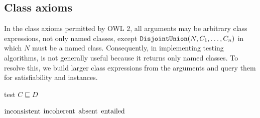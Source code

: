 \documentclass[paper.tex]{subfiles}
\begin{document}
\subsection{Class axioms}
\label{sec:algorithms:class}

In the class axioms permitted by OWL 2, all arguments may be arbitrary class expressions, not only named classes, except $\mathtt{DisjointUnion}(N, C_1, \ldots, C_n)$ in which $N$ must be a named class.  Consequently, in implementing testing algorithms,  is not generally useful because it returns only named classes.  To resolve this, we build larger class expressions from the arguments and query them for satisfiability and instances.  


\begin{algorithm}[H]
  \caption{test $C \sqsubseteq D$}
  \begin{algorithmic}[1]
    \raggedright
        \State \Return $\mathrm{inconsistent}$
        \label{alg:testSubClassOf:returnInconsistent}
        \State \Return $\mathrm{incoherent}$
        \label{alg:testSubClassOf:returnIncoherent}
        \State \Return $\mathrm{absent}$
      \Else
        \State \Return $\mathrm{entailed}$
        \label{alg:testSubClassOf:returnEntailed}
      \EndIf
    \EndFunction
  \end{algorithmic}
\end{algorithm}
\end{document}
